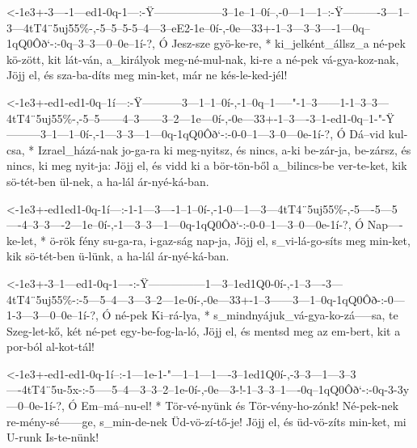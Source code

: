 
  {<-1e3+-3----1---ed1-0q-1---:-Ÿ------------------3--1e--1--0í--,-0---1---1--:-Ÿ----------3---1--3---4tT4¨5uj55\%-,-5--5--5-5--4---3--eE2-1e--0í-,-0e---33+-1--3---3--3----1---0q--1qQ0Ôð`-:-0q--3--3---0--0e--1í-?,}
  {  Ó    Jesz-sze gyö-ke-re, * ki_jelként_állsz_a né-pek kö-zött, kit lát-ván, a_királyok meg-né-mul-nak,           ki-re a né-pek vá-gya-koz-nak, Jöjj el, és sza-ba-díts meg min-ket,      már ne kés-le-ked-jél!}


  {<-1e3+-ed1-ed1-0q--1í---:-Ÿ-----------3---1--1--0í-,-1--0q--1-----"-1--3------1-1--3--3---4tT4¨5uj55\%-,-5--5------4--3------3--2---1e---0í-,-0e---33+-1--3----3--1-ed1-0q--1-"-Ÿ---------3--1---1--0í-,-1---3--3---1---0q-1qQ0Ôð`-:-0-0--1---3--0---0e-1í-?,}
  {  Ó    Dá--vid kul-csa, * Izrael_házá-nak jo-ga-ra   ki meg-nyitsz, és nincs, a-ki be-zár-ja,            be-zársz, és nincs, ki meg nyit-ja:  Jöjj el, és vidd ki a bör-tön-ből a_bilincs-be ver-te-ket, kik sö-tét-ben ül-nek,      a ha-lál ár-nyé-ká-ban.}


  {<-1e3+-ed1ed1-0q-1í---:-1-1---3----1--1--0í-,-1-0---1---3---4tT4¨5uj55\%-,-5----5---5----4--3--3----2---1e--0í-,-1---3--3---1---0q-1qQ0Ôð`-:-0-0--1---3--0---0e-1í-?,}
  {  Ó    Nap----ke-let, * ö-rök fény su-ga-ra,  i-gaz-ság nap-ja,            Jöjj el, s_vi-lá-go-síts meg min-ket, kik sö-tét-ben ü-lünk,      a ha-lál ár-nyé-ká-ban.}


  {<-1e3+-3--1---ed1-0q-1----:-Ÿ---------------1---3--1ed1Q0-0í-,-1--3----3---4tT4¨5uj55\%-:-5---5--4---3---3--2---1e-0í-,-0e---33+-1--3------3---1--0q-1qQ0Ôð-:-0---1-3---3---0--0e--1í-?,}
  {  Ó    né-pek Ki--rá-lya, * s_mindnyájuk_vá-gya-ko-zá-----sa,  te Szeg-let-kő,            két né-pet egy-be-fog-la-ló,  Jöjj el, és mentsd meg az em-bert,    kit a por-ból al-kot-tál!}


  {<-1e3+-ed1-ed1-0q-1í--:-1---1e-1-"---1--1---1----3--1ed1Q0í-,-3--3---1---3--3----4tT4¨5u-5x-:-5-----5--4---3--3--2--1e-0í-,-0e---3-!-1--3--3--1----0q--1qQ0Ôð`-:-0q-3-3y---0--0e-1í-?,}
  {  Ó    Em--má--nu-el! * Tör-vé-nyünk és Tör-vény-ho-zónk!     Né-pek-nek re-mény-sé------ge,  s_min-de-nek Üd-vö-zí-tő-je!  Jöjj el, és üd-vö-zíts min-ket,      mi U-runk Is-te-nünk!}

